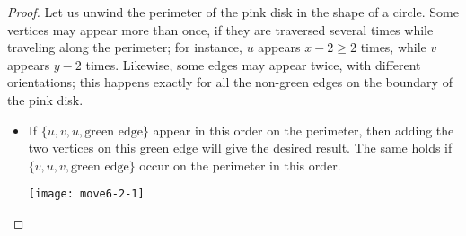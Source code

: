 \documentclass{article}
\begin{document}
\begin{proof}
Let us unwind the perimeter of the pink disk in the shape of a circle. Some vertices may appear more than once, if they are traversed several times while traveling along the perimeter; for instance, $u$ appears $x-2\ge 2$ times, while $v$ appears $y-2$ times. Likewise, some edges may appear twice, with different orientations; this happens exactly for all the non-green edges on the boundary of the pink disk.
\begin{itemize}
\setlength{\columnsep}{0em}
\item If $\{u,v,u,\text{green edge}\}$ appear in this order on the perimeter, then adding the two vertices on this green edge will give the desired result. The same holds if $\{v,u,v,\text{green edge}\}$ occur on the perimeter in this order.

\begin{center}\texttt{[image: move6-2-1]}\end{center}


\end{itemize}
\end{proof}
\end{document}
